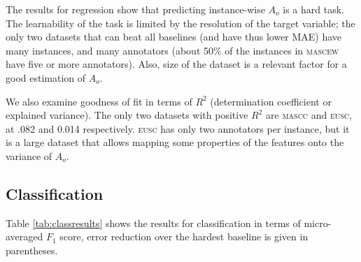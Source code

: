 \documentclass[11pt,a4paper]{article}
\begin{document}
The results for regression show that predicting instance-wise $A_o$ is a hard task. The learnability of the task is limited by the resolution of the target variable; the only two datasets that can beat all baselines (and have thus lower MAE) have many instances, and many annotators (about 50\% of the instances in \textsc{mascew} have five or more annotators). Also, size of the dataset is a relevant factor for a good estimation of $A_o$.

We also examine goodness of fit in terms of $R^2$ (determination coefficient or explained variance). The only two datasets with positive $R^2$ are \textsc{mascc} and \textsc{eusc}, at .082 and 0.014 respectively. \textsc{eusc} has only two annotators per instance, but it is a large dataset that allows mapping some properties of the features onto the variance of $A_o$.







\subsection{Classification}
\label{sec:class}

Table \ref{tab:classresults} shows the results for classification in terms of micro-averaged $F_1$ score, error reduction over the hardest baseline is given in parentheses.
\end{document}
